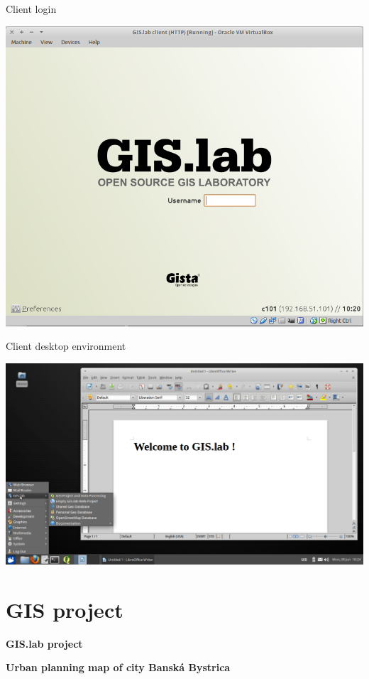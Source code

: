 \documentclass[12pt]{beamer}
\begin{document}
\begin{frame}{Client login}
	\begin{center}
		\includegraphics[keepaspectratio=true,height=0.7\textheight]{images/real-world-example/client-login.png}
	\end{center}
\end{frame}


\begin{frame}{Client desktop environment}
	\begin{center}
		\includegraphics[keepaspectratio=true,height=0.7\textheight]{images/real-world-example/client-desktop-libreoffice.png}
	\end{center}
\end{frame}


\section{GIS project}
\begin{frame}
	\begin{center}
		\LARGE\textbf{GIS.lab project}\normalsize

		\textbf{Urban planning map of city Banská Bystrica}
	\end{center}
\end{frame}
\end{document}
